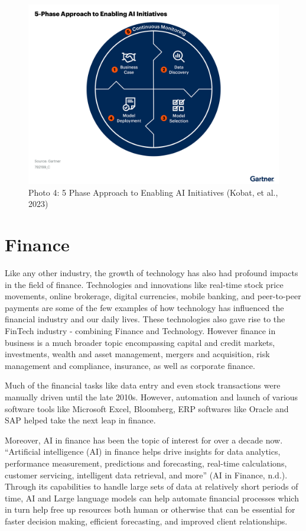 \documentclass[
]{article}
\begin{document}
\begin{figure}
\centering
\includegraphics{gartnermodel.png}
\caption{Photo 4: 5 Phase Approach to Enabling AI Initiatives (Kobat, et al., 2023)}
\end{figure}

\hypertarget{finance}{%
\section{Finance}\label{finance}}

Like any other industry, the growth of technology has also had profound impacts in the field of finance. Technologies and innovations like real-time stock price movements, online brokerage, digital currencies, mobile banking, and peer-to-peer payments are some of the few examples of how technology has influenced the financial industry and our daily lives. These technologies also gave rise to the FinTech industry - combining Finance and Technology. However finance in business is a much broader topic encompassing capital and credit markets, investments, wealth and asset management, mergers and acquisition, risk management and compliance, insurance, as well as corporate finance.

Much of the financial tasks like data entry and even stock transactions were manually driven until the late 2010s. However, automation and launch of various software tools like Microsoft Excel, Bloomberg, ERP softwares like Oracle and SAP helped take the next leap in finance.

Moreover, AI in finance has been the topic of interest for over a decade now. ``Artificial intelligence (AI) in finance helps drive insights for data analytics, performance measurement, predictions and forecasting, real-time calculations, customer servicing, intelligent data retrieval, and more'' (AI in Finance, n.d.). Through its capabilities to handle large sets of data at relatively short periods of time, AI and Large language models can help automate financial processes which in turn help free up resources both human or otherwise that can be essential for faster decision making, efficient forecasting, and improved client relationships.
\end{document}
